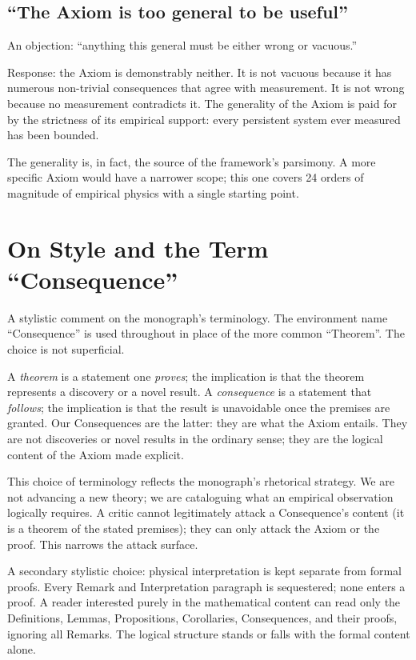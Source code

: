 \subsection*{``The Axiom is too general to be useful''}

An objection: ``anything this general must be either wrong or vacuous.''

Response: the Axiom is demonstrably neither.  It is not vacuous because it
has numerous non-trivial consequences that agree with measurement.  It is
not wrong because no measurement contradicts it.  The generality of the
Axiom is paid for by the strictness of its empirical support: every
persistent system ever measured has been bounded.

The generality is, in fact, the source of the framework's parsimony.  A
more specific Axiom would have a narrower scope; this one covers 24 orders
of magnitude of empirical physics with a single starting point.

\section*{On Style and the Term ``Consequence''}

A stylistic comment on the monograph's terminology.  The environment name
``Consequence'' is used throughout in place of the more common
``Theorem''.  The choice is not superficial.

A \emph{theorem} is a statement one \emph{proves}; the implication is that
the theorem represents a discovery or a novel result.  A
\emph{consequence} is a statement that \emph{follows}; the implication is
that the result is unavoidable once the premises are granted.  Our
Consequences are the latter: they are what the Axiom entails.  They are not
discoveries or novel results in the ordinary sense; they are the logical
content of the Axiom made explicit.

This choice of terminology reflects the monograph's rhetorical strategy.  We
are not advancing a new theory; we are cataloguing what an empirical
observation logically requires.  A critic cannot legitimately attack a
Consequence's content (it is a theorem of the stated premises); they can
only attack the Axiom or the proof.  This narrows the attack surface.

A secondary stylistic choice: physical interpretation is kept separate from
formal proofs.  Every Remark and Interpretation paragraph is sequestered;
none enters a proof.  A reader interested purely in the mathematical content
can read only the Definitions, Lemmas, Propositions, Corollaries,
Consequences, and their proofs, ignoring all Remarks.  The logical structure
stands or falls with the formal content alone.
